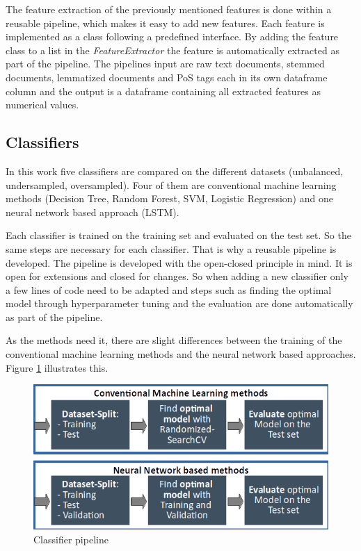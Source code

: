 The feature extraction of the previously mentioned features is done within a reusable pipeline, which makes it easy to add new features. Each feature is implemented as a class following a predefined interface. By adding the feature class to a list in the \textit{Feature\-Extractor} the feature is automatically extracted as part of the pipeline. The pipelines input are raw text documents, stemmed documents, lemmatized documents and PoS tags each in its own dataframe column and the output is a dataframe containing all extracted features as numerical values.

\subsection{Classifiers}
\label{ch:approachD}

In this work five classifiers are compared on the different datasets (unbalanced, undersampled, oversampled). Four of them are conventional machine learning methods (Decision Tree, Random Forest, SVM, Logistic Regression) and one neural network based approach (LSTM).

Each classifier is trained on the training set and evaluated on the test set. So the same steps are necessary for each classifier. That is why a reusable pipeline is developed. The pipeline is developed with the open-closed principle in mind. It is open for extensions and closed for changes. So when adding a new classifier only a few lines of code need to be adapted and steps such as finding the optimal model through hyperparameter tuning and the evaluation are done automatically as part of the pipeline.

As the methods need it, there are slight differences between the training of the conventional machine learning methods and the neural network based approaches. Figure \ref{fig:classifier_pipeline} illustrates this.

\begin{figure}[ht]
	\centering
	\includegraphics[width=0.7\linewidth]{figures/classifier_pipeline.png}
	\caption{Classifier pipeline}
	\label{fig:classifier_pipeline}
\end{figure}

